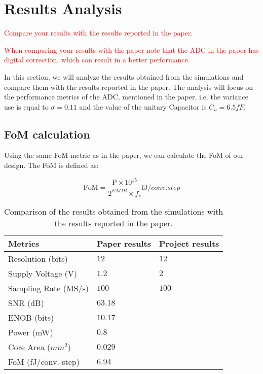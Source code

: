 \section{Results Analysis}
\label{sec:results}
\textcolor{red}{Compare your results with the results reported in the paper.}

\textcolor{red}{When comparing your results with the paper note that the ADC in the paper has digital correction, which can result in a better performance.}

In this section, we will analyze the results obtained from the simulations and compare them with the results reported in the paper. The analysis will focus on the performance metrics of the ADC, mentioned in the paper, i.e. the variance use is equal to $\sigma = 0.11$ and the value of the unitary Capacitor is $C_u = 6.5fF$.

\subsection{FoM calculation}

Using the same FoM metric as in the paper, we can calculate the FoM of our design. The FoM is defined as:

\begin{equation}
    \text{FoM} = \frac{\text{P} \times 10^{15}}{2^{ENOB} \times f_s } \si{\femto \joule \per conv.step}
    \label{eq:FoM}
\end{equation}

\begin{table}[h]
    \centering
    \caption{Comparison of the results obtained from the simulations with the results reported in the paper.}
    \begin{tabularx}{\textwidth}{>{\centering\arraybackslash}X >{\centering\arraybackslash}X >{\centering\arraybackslash}X }
        \toprule
        \textbf{Metrics} & \textbf{Paper results} & \textbf{Project results}\\
        \midrule
        Resolution (bits) & $12$ & $12$ \\
        \midrule
        Supply Voltage (V) & $1.2$ & $2$ \\
        \midrule
        Sampling Rate (MS/s) & $100$ & $100$  \\
        \midrule
        SNR (dB) & $63.18$ & $ $ \\
        \midrule
        ENOB (bits) & $10.17$ & $ $ \\
        \midrule
        Power (mW) & $0.8$ & $ $   \\
        \midrule
        Core Area ($mm^2$) & $0.029$ & $ $   \\
        \midrule
        FoM (fJ/conv.-step) & $6.94$ & $ $  \\
        \bottomrule
    \end{tabularx}
    \label{tab:comparison_results}
\end{table}

